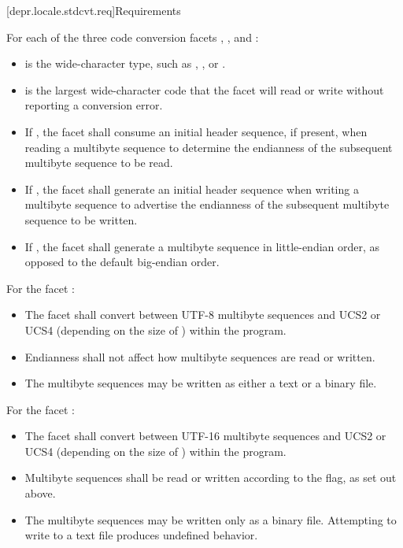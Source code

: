 [depr.locale.stdcvt.req]{Requirements}

\pnum
For each of the three code conversion facets ,
, and :
\begin{itemize}
\item
   is the wide-character type, such as
  , , or .
\item
   is the largest wide-character code that the facet
  will read or write without reporting a conversion error.
\item
  If , the facet shall consume an
  initial header sequence, if present, when reading a multibyte sequence
  to determine the endianness of the subsequent multibyte sequence to be read.
\item
  If , the facet shall generate an
  initial header sequence when writing a multibyte sequence to advertise
  the endianness of the subsequent multibyte sequence to be written.
\item
  If , the facet shall generate a
  multibyte sequence in little-endian order,
  as opposed to the default big-endian order.
\end{itemize}

\pnum
For the facet :
\begin{itemize}
\item
  The facet shall convert between UTF-8 multibyte sequences
  and UCS2 or UCS4 (depending on the size of )
  within the program.
\item
  Endianness shall not affect how multibyte sequences are read or written.
\item
  The multibyte sequences may be written as either a text or a binary file.
\end{itemize}

\pnum
For the facet :
\begin{itemize}
\item
  The facet shall convert between UTF-16 multibyte sequences
  and UCS2 or UCS4 (depending on the size of )
  within the program.
\item
  Multibyte sequences shall be read or written
  according to the  flag, as set out above.
\item
  The multibyte sequences may be written only as a binary file.
  Attempting to write to a text file produces undefined behavior.
\end{itemize}

